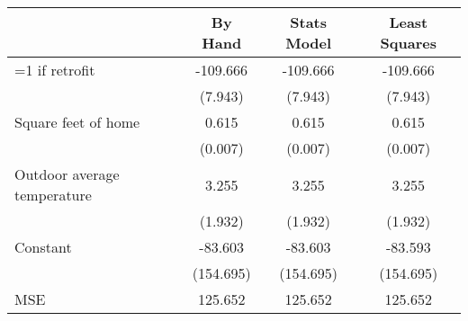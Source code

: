 \begin{tabular}{lccc}
\toprule
 & By Hand & Stats Model & Least Squares \\
\midrule
=1 if retrofit & -109.666 & -109.666 & -109.666 \\
  & (7.943) & (7.943) & (7.943) \\
Square feet of home & 0.615 & 0.615 & 0.615 \\
  & (0.007) & (0.007) & (0.007) \\
Outdoor average temperature & 3.255 & 3.255 & 3.255 \\
  & (1.932) & (1.932) & (1.932) \\
Constant & -83.603 & -83.603 & -83.593 \\
  & (154.695) & (154.695) & (154.695) \\
MSE & 125.652 & 125.652 & 125.652 \\
\bottomrule
\end{tabular}

